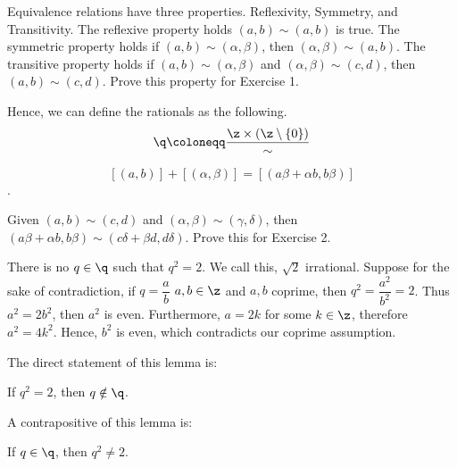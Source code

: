 \begin{definition}
    Equivalence relations have three properties.
    Reflexivity, Symmetry, and Transitivity.
	The reflexive property holds $(a,b)\sim(a,b)$ is true.
	The symmetric property holds if $(a,b)\sim(\alpha,\beta)$, then $(\alpha,\beta)\sim(a,b)$.
	The transitive property holds if $(a,b)\sim(\alpha, \beta)$ and $(\alpha,\beta)\sim(c,d)$, then $(a,b)\sim(c,d)$.
	Prove this property for Exercise 1.
\end{definition}

\begin{remark}
Hence, we can define the rationals as the following.
	\[\q \coloneqq \dfrac{\z\times(\z\setminus\{0\})}{\sim}\]
\end{remark}

\begin{definition}
	\[[(a,b)] + [(\alpha,\beta)] = [(a\beta + \alpha b, b\beta)]\].
\end{definition}

\begin{proposition*}{
	Given $(a,b)\sim(c,d)$ and $(\alpha,\beta)\sim(\gamma,\delta)$, then $(a \beta + \alpha b, b\beta)\sim(c \delta + \beta d, d\delta)$. Prove this for Exercise 2.
}
\end{proposition*}

\begin{lemma}{
	There is no $q\in\q$ such that $q^2 = 2$. We call this, $\sqrt{2}$ irrational.
}
	Suppose for the sake of contradiction, if $q = \dfrac{a}{b}$ $a,b\in\z$ and $a,b$ coprime, then $q^2 = \dfrac{a^2}{b^2} = 2$.
	Thus $a^2 = 2b^2$, then $a^2$ is even.
	Furthermore, $a = 2k$ for some $k\in\z$, therefore $a^2 = 4k^2$.
	Hence, $b^2$ is even, which contradicts our coprime assumption.
\end{lemma}

\begin{remark}
	The direct statement of this lemma is:
	\begin{displayquote}
		If $q^2 = 2$, then $q\notin\q$.
	\end{displayquote}
	A contrapositive of this lemma is:
	\begin{displayquote}
		If $q\in\q$, then $q^2\neq 2$.
	\end{displayquote}
\end{remark}